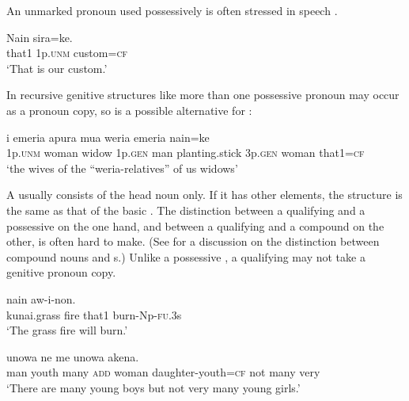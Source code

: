 An unmarked pronoun used possessively is often stressed in speech .

\ea%
\label{ex:4:x408}
\gll Nain   sira=ke. \\
     that1  1p.\textsc{unm}  custom=\textsc{cf} \\
\glt`That is our custom.'
\z

In recursive genitive structures like  more than one possessive pronoun may occur as a pronoun copy, so  is a possible alternative for :

\ea%
\label{ex:4:x411}
\gll i  emeria  apura    mua  weria   emeria  nain=ke\\
  1p.\textsc{unm}  woman  widow  1p.\textsc{gen}  man  planting.stick  3p.\textsc{gen}  woman  that1=\textsc{cf}  \\
\glt`the wives of the ``weria-relatives'' of us widows'
\z

 

A  usually consists of the head noun only. If it has other elements, the structure is the same as that of the basic . The distinction between a qualifying  and a possessive  on the one hand, and between a qualifying  and a  compound on the other, is often hard to make. (See   for a discussion on the distinction between compound nouns and s.) Unlike a possessive , a qualifying  may not take a genitive pronoun copy. 

\ea%
\label{ex:4:x413}
\gll {}    nain  aw-i-non. \\
    kunai.grass  fire  that1  burn-Np-\textsc{fu}.3s  \\
\glt`The grass fire will burn.'
\z

\ea%
\label{ex:4:x412}
\gll {}    unowa  ne   \textstyleEmphasizedVernacularWords{=} me  unowa  akena.\\
  man  youth  many  \textsc{add}  woman  daughter-youth=\textsc{cf} not  many  very     \\
\glt`There are many young boys but not very many young girls.'
\z

